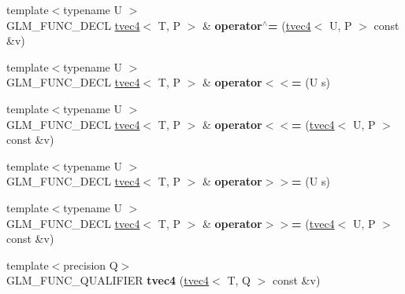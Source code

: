 \begin{DoxyCompactItemize}
\item 
{\footnotesize template$<$typename U $>$ }\\G\+L\+M\+\_\+\+F\+U\+N\+C\+\_\+\+D\+E\+CL \hyperlink{structglm_1_1detail_1_1tvec4}{tvec4}$<$ T, P $>$ \& {\bfseries operator$^\wedge$=} (\hyperlink{structglm_1_1detail_1_1tvec4}{tvec4}$<$ U, P $>$ const \&v)\hypertarget{structglm_1_1detail_1_1tvec4_a5e3b455605338080eaedad86af4eb38e}{}\label{structglm_1_1detail_1_1tvec4_a5e3b455605338080eaedad86af4eb38e}

\item 
{\footnotesize template$<$typename U $>$ }\\G\+L\+M\+\_\+\+F\+U\+N\+C\+\_\+\+D\+E\+CL \hyperlink{structglm_1_1detail_1_1tvec4}{tvec4}$<$ T, P $>$ \& {\bfseries operator$<$$<$=} (U s)\hypertarget{structglm_1_1detail_1_1tvec4_a710de783451759b12b3e5a5764833cbf}{}\label{structglm_1_1detail_1_1tvec4_a710de783451759b12b3e5a5764833cbf}

\item 
{\footnotesize template$<$typename U $>$ }\\G\+L\+M\+\_\+\+F\+U\+N\+C\+\_\+\+D\+E\+CL \hyperlink{structglm_1_1detail_1_1tvec4}{tvec4}$<$ T, P $>$ \& {\bfseries operator$<$$<$=} (\hyperlink{structglm_1_1detail_1_1tvec4}{tvec4}$<$ U, P $>$ const \&v)\hypertarget{structglm_1_1detail_1_1tvec4_a42e78a66bcb14999e38ff18ccfcd14d1}{}\label{structglm_1_1detail_1_1tvec4_a42e78a66bcb14999e38ff18ccfcd14d1}

\item 
{\footnotesize template$<$typename U $>$ }\\G\+L\+M\+\_\+\+F\+U\+N\+C\+\_\+\+D\+E\+CL \hyperlink{structglm_1_1detail_1_1tvec4}{tvec4}$<$ T, P $>$ \& {\bfseries operator$>$$>$=} (U s)\hypertarget{structglm_1_1detail_1_1tvec4_aff212ccd60efa8fa3a4c7e642afa6046}{}\label{structglm_1_1detail_1_1tvec4_aff212ccd60efa8fa3a4c7e642afa6046}

\item 
{\footnotesize template$<$typename U $>$ }\\G\+L\+M\+\_\+\+F\+U\+N\+C\+\_\+\+D\+E\+CL \hyperlink{structglm_1_1detail_1_1tvec4}{tvec4}$<$ T, P $>$ \& {\bfseries operator$>$$>$=} (\hyperlink{structglm_1_1detail_1_1tvec4}{tvec4}$<$ U, P $>$ const \&v)\hypertarget{structglm_1_1detail_1_1tvec4_ad8f7d2a8465cfd294b47b33639127ebf}{}\label{structglm_1_1detail_1_1tvec4_ad8f7d2a8465cfd294b47b33639127ebf}

\item 
{\footnotesize template$<$precision Q$>$ }\\G\+L\+M\+\_\+\+F\+U\+N\+C\+\_\+\+Q\+U\+A\+L\+I\+F\+I\+ER {\bfseries tvec4} (\hyperlink{structglm_1_1detail_1_1tvec4}{tvec4}$<$ T, Q $>$ const \&v)\hypertarget{structglm_1_1detail_1_1tvec4_a3030b13b21c84c52f89f14f802ae99f5}{}\label{structglm_1_1detail_1_1tvec4_a3030b13b21c84c52f89f14f802ae99f5}


\end{DoxyCompactItemize}
